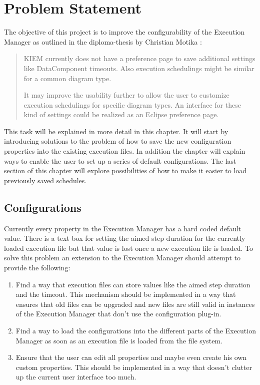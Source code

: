 \chapter{Problem Statement}
\label{chapter:ConfTask}
The objective of this project is to improve the configurability of the
Execution Manager as outlined in the diploma-thesis by Christian Motika\cite{cmot-dt} :
\begin{quote}
 \ac{KIEM} currently does not have a preference page to save
additional settings like DataComponent timeouts. Also execution schedulings
might be similar for a common diagram type.

It may improve the usability further to allow the user to customize execution
schedulings for specific diagram types. An interface for these kind of settings
could be realized as an Eclipse preference page.
\end{quote}

This task will be explained in more detail in this chapter. It will start by introducing 
solutions to the problem of how to save the new configuration properties into the existing 
execution files. In addition the chapter will explain ways to enable the user to set up a 
series of default configurations. The last section of this chapter will explore 
possibilities of how to make it easier to load previously saved schedules.

\section{Configurations}
\label{section:ConfTaskConfig}
Currently every property in the Execution Manager has a hard coded default value. There is a text box
for setting the aimed step duration for the currently loaded execution file but that value
is lost once a new execution file is loaded.
To solve this problem an extension to the Execution Manager should attempt to provide the following:
\begin{enumerate}
 \item Find a way that execution files can store values like the aimed step duration and the timeout.
This mechanism should be implemented in a way that ensures that old files can be upgraded and new
files are still valid in instances of the Execution Manager that don't use the configuration plug-in.
 \item Find a way to load the configurations into the different parts of the Execution Manager as soon as an
execution file is loaded from the file system.
 \item Ensure that the user can edit all properties and maybe even create his own custom properties.
This should be implemented in a way that doesn't clutter up the current user interface too much.
\end{enumerate}

